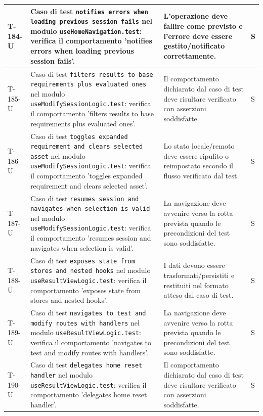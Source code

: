 \documentclass[a4paper,12pt]{article}
\begin{document}
{{\begin{longtable}{|>{\RaggedRight\arraybackslash}p{1.55cm}|>{\RaggedRight\arraybackslash}p{8.0cm}|>{\RaggedRight\arraybackslash}p{4.6cm}|>{\RaggedRight\arraybackslash}p{1.2cm}|}
        \hline
        T-184-U & Caso di test \texttt{notifies errors when loading previous session fails} nel modulo \texttt{useHomeNavigation.test}: verifica il comportamento 'notifies errors when loading previous session fails'. & L'operazione deve fallire come previsto e l'errore deve essere gestito/notificato correttamente. & S \\
        \hline
        T-185-U & Caso di test \texttt{filters results to base requirements plus evaluated ones} nel modulo \texttt{useModifySessionLogic.test}: verifica il comportamento 'filters results to base requirements plus evaluated ones'. & Il comportamento dichiarato dal caso di test deve risultare verificato con asserzioni soddisfatte. & S \\
        \hline
        T-186-U & Caso di test \texttt{toggles expanded requirement and clears selected asset} nel modulo \texttt{useModifySessionLogic.test}: verifica il comportamento 'toggles expanded requirement and clears selected asset'. & Lo stato locale/remoto deve essere ripulito o reimpostato secondo il flusso verificato dal test. & S \\
        \hline
        T-187-U & Caso di test \texttt{resumes session and navigates when selection is valid} nel modulo \texttt{useModifySessionLogic.test}: verifica il comportamento 'resumes session and navigates when selection is valid'. & La navigazione deve avvenire verso la rotta prevista quando le precondizioni del test sono soddisfatte. & S \\
        \hline
        T-188-U & Caso di test \texttt{exposes state from stores and nested hooks} nel modulo \texttt{useResultViewLogic.test}: verifica il comportamento 'exposes state from stores and nested hooks'. & I dati devono essere trasformati/persistiti e restituiti nel formato atteso dal caso di test. & S \\
        \hline
        T-189-U & Caso di test \texttt{navigates to test and modify routes with handlers} nel modulo \texttt{useResultViewLogic.test}: verifica il comportamento 'navigates to test and modify routes with handlers'. & La navigazione deve avvenire verso la rotta prevista quando le precondizioni del test sono soddisfatte. & S \\
        \hline
        T-190-U & Caso di test \texttt{delegates home reset handler} nel modulo \texttt{useResultViewLogic.test}: verifica il comportamento 'delegates home reset handler'. & Il comportamento dichiarato dal caso di test deve risultare verificato con asserzioni soddisfatte. & S \\

\end{longtable}}}
\end{document}
